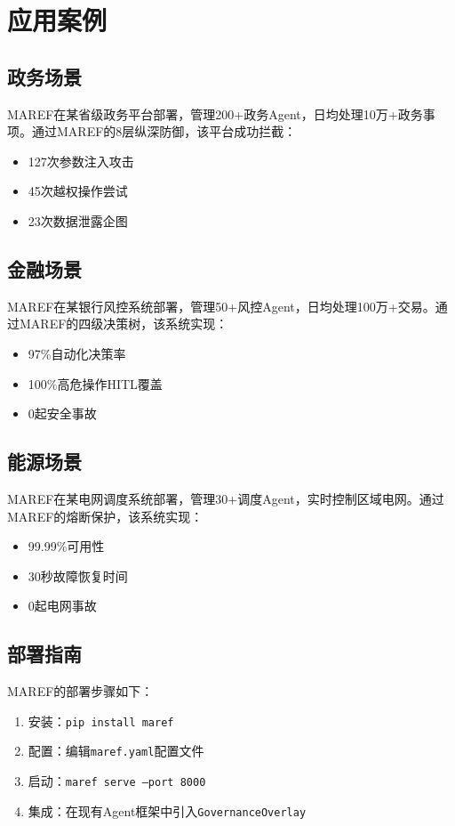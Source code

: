 \section{应用案例}

\subsection{政务场景}

MAREF在某省级政务平台部署，管理200+政务Agent，日均处理10万+政务事项。通过MAREF的8层纵深防御，该平台成功拦截：
\begin{itemize}
    \item 127次参数注入攻击
    \item 45次越权操作尝试
    \item 23次数据泄露企图
\end{itemize}

\subsection{金融场景}

MAREF在某银行风控系统部署，管理50+风控Agent，日均处理100万+交易。通过MAREF的四级决策树，该系统实现：
\begin{itemize}
    \item 97\%自动化决策率
    \item 100\%高危操作HITL覆盖
    \item 0起安全事故
\end{itemize}

\subsection{能源场景}

MAREF在某电网调度系统部署，管理30+调度Agent，实时控制区域电网。通过MAREF的熔断保护，该系统实现：
\begin{itemize}
    \item 99.99\%可用性
    \item 30秒故障恢复时间
    \item 0起电网事故
\end{itemize}

\subsection{部署指南}

MAREF的部署步骤如下：

\begin{enumerate}
    \item 安装：\texttt{pip install maref}
    \item 配置：编辑\texttt{maref.yaml}配置文件
    \item 启动：\texttt{maref serve --port 8000}
    \item 集成：在现有Agent框架中引入\texttt{GovernanceOverlay}
\end{enumerate}

